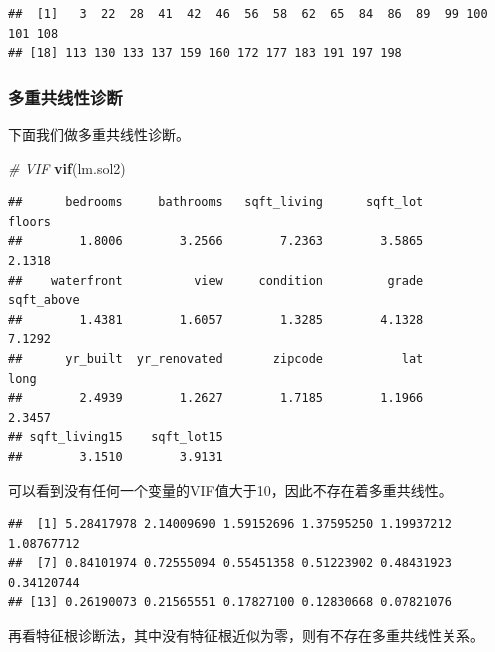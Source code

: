 \documentclass[]{article}
\newenvironment{Shaded}{\begin{snugshade}}{\end{snugshade}}
\newcommand{\KeywordTok}[1]{\textcolor[rgb]{0.13,0.29,0.53}{\textbf{#1}}}
\newcommand{\DecValTok}[1]{\textcolor[rgb]{0.00,0.00,0.81}{#1}}
\newcommand{\StringTok}[1]{\textcolor[rgb]{0.31,0.60,0.02}{#1}}
\newcommand{\CommentTok}[1]{\textcolor[rgb]{0.56,0.35,0.01}{\textit{#1}}}
\newcommand{\OperatorTok}[1]{\textcolor[rgb]{0.81,0.36,0.00}{\textbf{#1}}}
\newcommand{\NormalTok}[1]{#1}
\begin{document}
\begin{verbatim}
##  [1]   3  22  28  41  42  46  56  58  62  65  84  86  89  99 100 101 108
## [18] 113 130 133 137 159 160 172 177 183 191 197 198
\end{verbatim}

\subsubsection{多重共线性诊断}

下面我们做多重共线性诊断。

\begin{Shaded}
\begin{Highlighting}[]
\CommentTok{# VIF}
\KeywordTok{vif}\NormalTok{(lm.sol2)}
\end{Highlighting}
\end{Shaded}

\begin{verbatim}
##      bedrooms     bathrooms   sqft_living      sqft_lot        floors 
##        1.8006        3.2566        7.2363        3.5865        2.1318 
##    waterfront          view     condition         grade    sqft_above 
##        1.4381        1.6057        1.3285        4.1328        7.1292 
##      yr_built  yr_renovated       zipcode           lat          long 
##        2.4939        1.2627        1.7185        1.1966        2.3457 
## sqft_living15    sqft_lot15 
##        3.1510        3.9131
\end{verbatim}

可以看到没有任何一个变量的VIF值大于10，因此不存在着多重共线性。

\begin{Shaded}
\end{Shaded}

\begin{verbatim}
##  [1] 5.28417978 2.14009690 1.59152696 1.37595250 1.19937212 1.08767712
##  [7] 0.84101974 0.72555094 0.55451358 0.51223902 0.48431923 0.34120744
## [13] 0.26190073 0.21565551 0.17827100 0.12830668 0.07821076
\end{verbatim}

再看特征根诊断法，其中没有特征根近似为零，则有不存在多重共线性关系。
\end{document}
